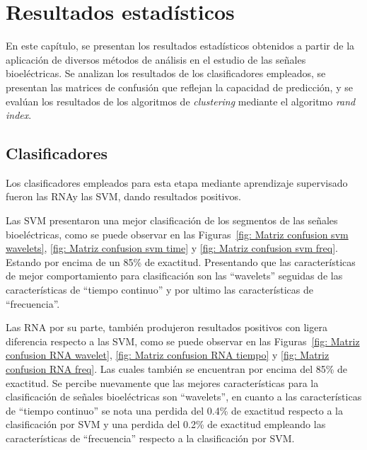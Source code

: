 \chapter{Resultados estadísticos}
En este capítulo, se presentan los resultados estadísticos obtenidos a partir de la aplicación de diversos métodos de análisis en el estudio de las señales bioeléctricas. Se analizan los resultados de los clasificadores empleados, se presentan las \gls{matrices de confusión} que reflejan la capacidad de predicción, y se evalúan los resultados de los algoritmos de \textit{clustering} mediante el algoritmo \textit{rand index}.

\section{Clasificadores}
Los clasificadores empleados para esta etapa mediante aprendizaje supervisado fueron las \gls{RNA}y las \gls{SVM}, dando resultados positivos. 

Las SVM presentaron una mejor clasificación de los segmentos de las  señales bioeléctricas, como se puede observar en las Figuras~\ref{fig: Matriz confusion svm wavelets}, \ref{fig: Matriz confusion svm time} y  \ref{fig: Matriz confusion svm freq}. Estando por encima de un 85\% de exactitud. Presentando que las características de mejor comportamiento para clasificación son las  ``wavelets'' seguidas de las características de ``tiempo continuo'' y por ultimo las características de ``frecuencia''.

Las RNA por su parte, también produjeron resultados positivos con ligera diferencia respecto a las SVM, como se puede observar en las Figuras~\ref{fig: Matriz confusion RNA wavelet}, \ref{fig: Matriz confusion RNA tiempo} y \ref{fig: Matriz confusion RNA freq}. Las cuales también se encuentran por encima del 85\% de exactitud. Se percibe nuevamente que las mejores características para la clasificación de señales bioeléctricas son ``wavelets'', en cuanto a las  características de ``tiempo continuo'' se nota una perdida del 0.4\% de exactitud respecto a la clasificación por SVM y una perdida del 0.2\% de exactitud empleando las características de ``frecuencia'' respecto a la clasificación por SVM.

